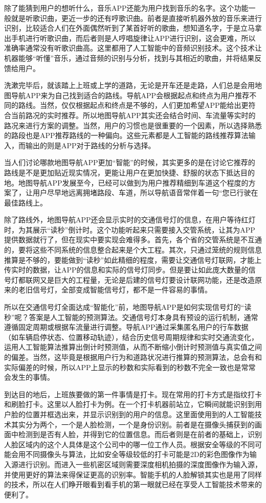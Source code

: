 除了能猜到用户的想听什么，音乐APP还能为用户找到音乐的名字。这个功能一般就是听歌识曲，更近一步的还有哼歌识曲。前者是直接听机器外放的音乐来进行识别，比较适合人们在外面偶然听到了某首好听的歌曲，想知道名字，于是立马拿出手机进行听歌识曲，而后者则是人哼唱旋律让APP进行识别，这会更难，所以准确率通常没有听歌识曲高。这里都用了人工智能中的音频识别技术。这个技术让机器能够“听懂”音乐，通过音频的识别与分析，找到与其相近的歌曲，并将结果反馈给用户。



洗漱完毕后，就该踏上上班或上学的道路，无论是开车还是走路，人们总是会用地图导航APP来为自己找到适合的路线。导航APP会根据起点和终点为用户推荐不同的路线。当然，仅仅根据起点和终点是不够的，人们更加希望APP能给出更符合当前路况的实时推荐。所以地图导航APP其实还会结合时间、车流量等实时的路况来进行方案的调整。当然，用户的习惯也是很重要的一个因素，所以选择熟悉的路段也是APP推荐路线的一种偏向。这些元素都是人工智能的路线推荐算法输入，而输出的则是APP对于路线的分析与选择。

当人们讨论哪款地图导航APP更加“智能”的时候，其实更多的是在讨论它推荐的路线是不是更加贴近现实情况，更能让用户在更加快捷、舒服的状态下抵达目的地。地图导航APP发展至今，已经可以做到为用户推荐精细到车道这个程度的方案了，让用户尽早地远离拥堵路段、车道，所以导航语音常伴着一句“您已行驶在最佳路线上。


除了路线外，地图导航APP还会显示实时的交通信号灯的信息，在用户等待红灯时，为其展示“读秒”倒计时。这个功能听起来只需要接入交管系统，让其为APP提供数据就行了，但在现实中要实现会难得多。首先，各个省的交管系统是不互通的，要将这些不同系统的信息整合起来是个大工程。其次，只通过笼统的规则信息推算是不够的，要能做到“读秒”如此精细的程度，需要让交通信号灯联网，才能上传实时的数据，让APP的信息和实际的信号灯同步。但是要让如此庞大数量的信号灯都联网又是巨大的工程量，无论是后建的信号灯要设计联网功能，还是改造原来的老旧信号灯，全部变成智能信号灯，都不是一件容易的事情。

所以在交通信号灯全面达成“智能化”前，地图导航APP是如何实现信号灯的“读秒”呢？答案是人工智能的预测算法。交通信号灯本身具有预设的运行机制，通常遵循固定周期或根据车流量进行调整。导航APP通过采集匿名用户的行车数据（如车辆启停状态、位置移动轨迹），结合历史信号周期规律和实时交通流变化，运用人工智能算法推算出倒计时预测值，从而不断缩小倒计时预测值与真实值之间的偏差。当然，这毕竟是根据用户行为和道路状况进行推算的预测算法，总会有和实际偏差的时候，所以APP上显示的秒数和实际看到的秒数不完全一致也是常常会发生的事情。

到达目的地后，上班族要做的第一件事情是打卡。现在常用的打卡方式是指纹打卡和刷脸打卡。这里以人脸打卡为例。在一个打卡机器前站立，它瞬间就能识别到用户脸的位置并框选出来，并显示识别到的用户的信息。这里面使用到的人工智能技术其实分为两个，一个是人脸检测，一个是身份识别。前者是在摄像头捕获到的画面中检测到是否有人脸，并得到它的位置信息。而后者则是在前者的基础上，识别人脸区域内的这个人具体是这个公司中的哪一位工作人员。根据安全等级的不同可能会用不同摄像头与算法，比如安全等级较低的打卡可能是2D的彩色图像作为输入源进行识别。而进入一些机密区域则需要深度相机拍摄的深度图像作为输入源，并使用更好的算法来得保证更高的识别率。智能手机的人脸解锁其实也是用了同样的技术，所以在人们睁开眼看到看手机的第一眼就已经在享受人工智能技术带来的便利了。


